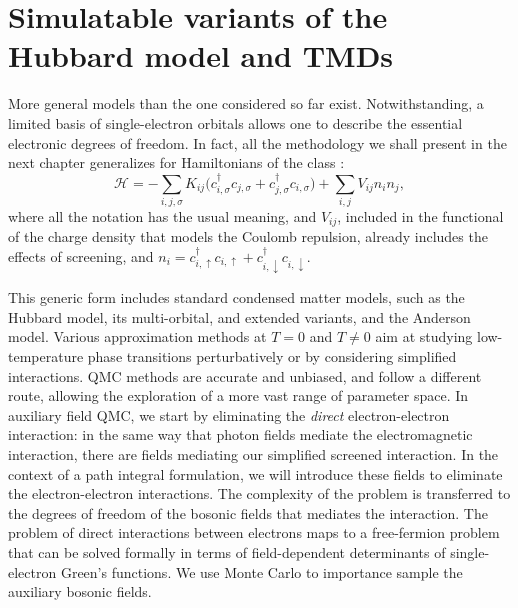 \section{Simulatable variants of the Hubbard model and TMDs}\label{sec:variants}

More general  models than the one considered so far exist.
Notwithstanding, a limited basis of single-electron orbitals allows one to describe the essential electronic degrees of freedom.
In fact, all the methodology we shall present in the next chapter generalizes for Hamiltonians of the class \cite{hanke_electronic_nodate}:
\begin{equation}\label{eq:variantsForm}
\mathcal{H} = - \sum_{i, j, \sigma} K_{ij} \bigg( c_{i, \sigma}^\dagger c_{j, \sigma} + c_{j, \sigma}^\dagger c_{i, \sigma} \bigg) + \sum_{i, j} V_{ij} n_i n_j ,
\end{equation}
where all the notation has the usual meaning, and $V_{ij}$, included in the functional of the charge density that models the Coulomb repulsion, already includes the effects of screening, and $n_i = c_{i,\uparrow}^\dagger c_{i,\uparrow} + c_{i,\downarrow}^\dagger c_{i,\downarrow}$.

This generic form includes standard condensed matter models, such as the Hubbard model, its multi-orbital, and extended variants, and the Anderson model.
Various approximation methods at $T = 0$ and $T \neq 0$ aim at studying low-temperature phase transitions perturbatively or by considering simplified interactions.
\ac{QMC} methods are accurate and unbiased, and follow a different route, allowing the exploration of a more vast range of parameter space.
In auxiliary field \ac{QMC}, we start by eliminating the \emph{direct} electron-electron interaction: in the same way that photon fields mediate the electromagnetic interaction, there are fields mediating our simplified screened interaction.
In the context of a path integral formulation, we will introduce these fields to eliminate the electron-electron interactions.
The complexity of the problem is transferred to the degrees of freedom of the bosonic fields that mediates the interaction.
The problem of direct interactions between electrons maps to a free-fermion problem that can be solved formally in terms of field-dependent determinants of single-electron Green's functions.
We use Monte Carlo to importance sample the auxiliary bosonic fields.

